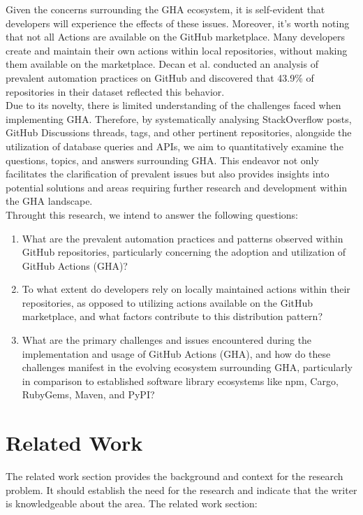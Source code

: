 \documentclass[conference]{IEEEtran}
\begin{document}
Given the concerns surrounding the GHA ecosystem, it is self-evident that developers will experience the effects of these issues.  Moreover, it's worth noting that not all Actions are available on the GitHub marketplace. Many developers create and maintain their own actions within local repositories, without making them available on the marketplace. Decan et al. \cite{b4} conducted an analysis of prevalent automation practices on GitHub and discovered that 43.9\% of repositories in their dataset reflected this behavior.\\
Due to its novelty, there is limited understanding of the challenges faced when implementing GHA.  
Therefore,  by systematically analysing StackOverflow posts, GitHub Discussions threads, tags, and other pertinent repositories, alongside the utilization of database queries and APIs, we aim to quantitatively examine the questions, topics, and answers surrounding GHA. This endeavor not only facilitates the clarification of prevalent issues but also provides insights into potential solutions and areas requiring further research and development within the GHA landscape.\\
Throught this research, we intend to answer the following questions:

\begin{enumerate}
    \item What are the prevalent automation practices and patterns observed within GitHub repositories, particularly concerning the adoption and utilization of GitHub Actions (GHA)?
    
    \item To what extent do developers rely on locally maintained actions within their repositories, as opposed to utilizing actions available on the GitHub marketplace, and what factors contribute to this distribution pattern?
    
    \item What are the primary challenges and issues encountered during the implementation and usage of GitHub Actions (GHA), and how do these challenges manifest in the evolving ecosystem surrounding GHA, particularly in comparison to established software library ecosystems like npm, Cargo, RubyGems, Maven, and PyPI?
\end{enumerate}

\section{Related Work}
The related work section provides the background and context for the research problem. It should establish the need for the research and indicate that the writer is knowledgeable about the area. The related work section:
\end{document}
